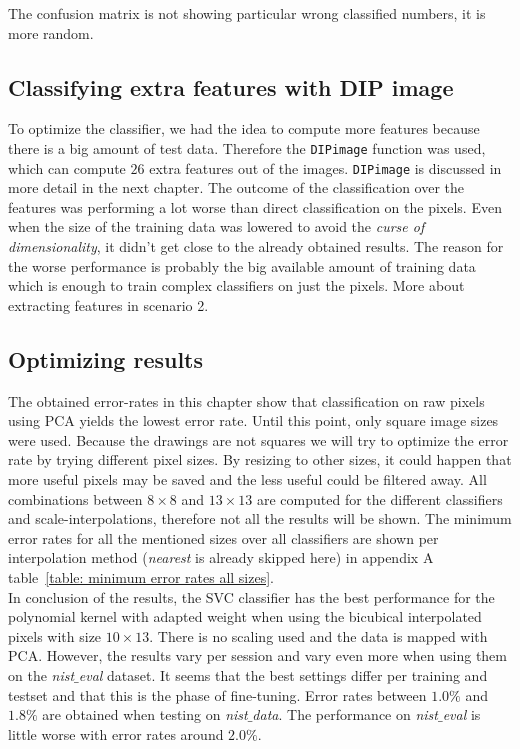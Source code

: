 \documentclass{article}
\begin{document}
The confusion matrix is not showing particular wrong classified numbers, it is more random. 

\subsection{Classifying extra features with DIP image}

To optimize the classifier, we had the idea to compute more features because there is a big amount of test data. Therefore the \texttt{DIPimage} function was used, which can compute $26$ extra features out of the images. \texttt{DIPimage} is discussed in more detail in the next chapter. The outcome of the classification over the features was performing a lot worse than direct classification on the pixels. Even when the size of the training data was lowered to avoid the \emph{curse of dimensionality}, it didn't get close to the already obtained results. The reason for the worse performance is probably the big available amount of training data which is enough to train complex classifiers on just the pixels. More about extracting features in scenario 2.

\subsection{Optimizing results}

The obtained error-rates in this chapter show that classification on raw pixels using PCA yields the lowest error rate. Until this point, only square image sizes were used. Because the drawings are not squares we will try to optimize the error rate by trying different pixel sizes. By resizing to other sizes, it could happen that more useful pixels may be saved and the less useful could be filtered away. All combinations between $8 \times 8$ and $13 \times 13$ are computed for the different classifiers and scale-interpolations, therefore not all the results will be shown. The minimum error rates for all the mentioned sizes over all classifiers are shown per interpolation method (\textit{nearest} is already skipped here) in appendix A table~\ref{table: minimum error rates all sizes}. \\

In conclusion of the results, the SVC classifier has the best performance for the polynomial kernel with adapted weight when using the bicubical interpolated pixels with size $10 \times 13$. There is no scaling used and the data is mapped with PCA. However, the results vary per session and vary even more when using them on the \textit{nist$\_$eval} dataset. It seems that the best settings differ per training and testset and that this is the phase of fine-tuning. Error rates between $1.0\%$ and $1.8\%$ are obtained when testing on \textit{nist$\_$data}. The performance on \textit{nist$\_$eval} is little worse with error rates around $2.0\%$. 
\end{document}
